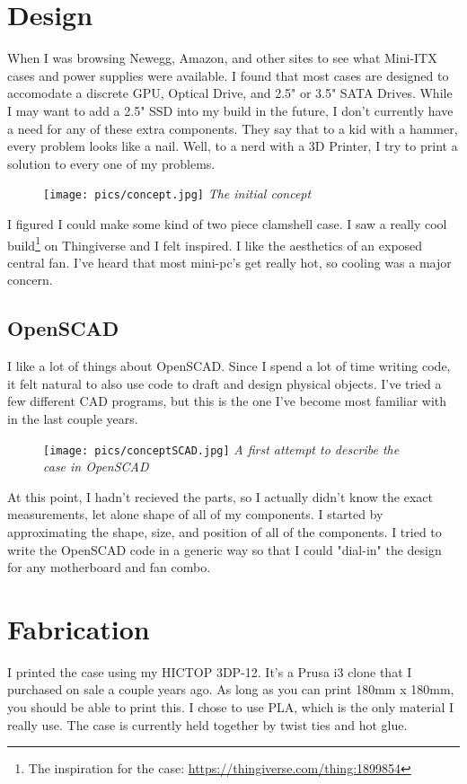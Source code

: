 \documentclass{article}
\begin{document}
\section{Design}
When I was browsing Newegg, Amazon, and other sites to see what Mini-ITX cases and power supplies were available. I found that most cases are designed to accomodate a discrete GPU, Optical Drive, and 2.5" or 3.5" SATA Drives. While I may want to add a 2.5" SSD into my build in the future, I don't currently have a need for any of these extra components. They say that to a kid with a hammer, every problem looks like a nail. Well, to a nerd with a 3D Printer, I try to print a solution to every one of my problems.
\begin{figure}[h]
\texttt{[image: pics/concept.jpg]}
\emph{The initial concept}
\end{figure}

I figured I could make some kind of two piece clamshell case. I saw a really cool build\footnote{The inspiration for the case: \url{https://thingiverse.com/thing:1899854}} on Thingiverse and I felt inspired. I like the aesthetics of an exposed central fan. I've heard that most mini-pc's get really hot, so cooling was a major concern.

\subsection{OpenSCAD}
I like a lot of things about OpenSCAD. Since I spend a lot of time writing code, it felt natural to also use code to draft and design physical objects. I've tried a few different CAD programs, but this is the one I've become most familiar with in the last couple years.

\begin{figure}[h]
\texttt{[image: pics/conceptSCAD.jpg]}
\emph{A first attempt to describe the case in OpenSCAD}
\end{figure}
At this point, I hadn't recieved the parts, so I actually didn't know the exact measurements, let alone shape of all of my components. I started by approximating the shape, size, and position of all of the components. I tried to write the OpenSCAD code in a generic way so that I could "dial-in" the design for any motherboard and fan combo.
 
\section{Fabrication}
I printed the case using my HICTOP 3DP-12. It's a Prusa i3 clone that I purchased on sale a couple years ago. As long as you can print 180mm x 180mm, you should be able to print this. I chose to use PLA, which is the only material I really use. The case is currently held together by twist ties and hot glue.
\end{document}
